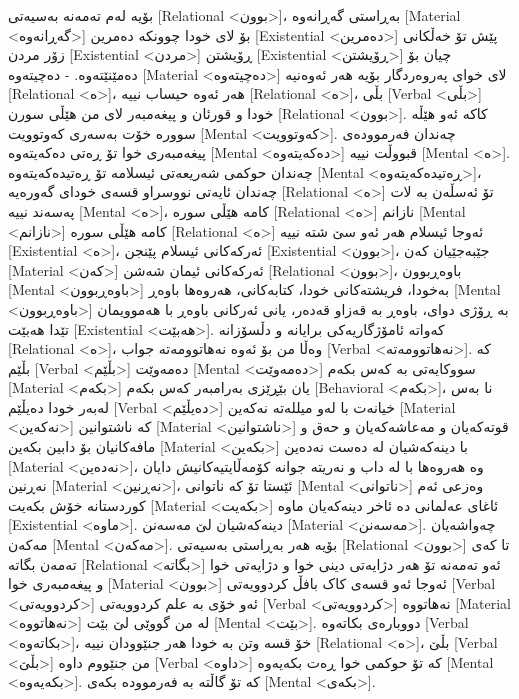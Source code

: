 بۆیە لەم تەمەنە بەسیەتی [Relational <بوون>]، بەڕاستی گەڕانەوە [Material <گەڕانەوە>] بۆ لای خودا چوونکە دەمرین [Existential <دەمرین>] پێش تۆ خەڵکانی زۆر مردن [Existential <مردن>] ڕۆیشتن [Existential <ڕۆیشتن>] چیان بۆ دەمێنێتەوە. - دەچیتەوە [Material <دەچیتەوە>] لای خوای پەروەردگار بۆیە هەر ئەوەنیە [Relational <ە>]، هەر ئەوە حیساب نییە [Relational <ە>]، بڵی [Verbal <بڵی>] خودا و قورئان و پیغەمبەر لای من هێڵی سورن [Relational <بوون>]. کاکە ئەو هێڵە سوورە خۆت بەسەری کەوتوویت [Mental <کەوتوویت>]. چەندان فەرموودەی پیغەمبەری خوا تۆ ڕەتی دەکەیتەوە [Mental <دەکەیتەوە>] قبووڵت نییە [Mental <ە>].
چەندان حوکمی شەریعەتی ئیسلامە تۆ ڕەتیدەکەیتەوە [Mental <ڕەتیدەکەیتەوە>]، چەندان ئایەتی نووسراو قسەی خودای گەورەیە [Relational <ە>] تۆ ئەسڵەن بە لات پەسەند نییە [Mental <ە>]، کامە هێڵی سورە [Relational <ە>] نازانم [Mental <نازانم>] کامە هێڵی سورە [Relational <ە>] ئەوجا ئیسلام هەر ئەو سێ شتە نییە [Existential <ە>]، ئەرکەکانی ئیسلام پێنجن [Existential <بوون>]، جێبەجێیان کەن [Material <کەن>] ئەرکەکانی ئیمان شەشن [Relational <بوون>]، باوەڕبوون [Mental <باوەڕبوون>] بەخودا، فریشتەکانی خودا، کتابەکانی، هەروەها باوەڕ [Mental <باوەڕبوون>] بە ڕۆژی دوای، باوەڕ بە قەزاو قەدەر، یانی ئەرکانی باوەڕ با هەموویمان تێدا هەبێت [Existential <هەبێت>]. کەواتە ئامۆژگاریەکی برایانە و دڵسۆزانە [Relational <ە>]، وەڵا من بۆ ئەوە نەهاتوومەتە جواب [Verbal <نەهاتوومەتە>].
کە بڵێم [Verbal <بڵێم>] دەمەوێت [Mental <دەمەوێت>] سووکایەتی بە کەس بکەم [Material <بکەم>] یان بێڕێزی بەرامبەر کەس بکەم [Behavioral <بکەم>]، نا بەس لەبەر خودا دەیڵێم [Verbal <دەیڵێم>] خیانەت با لەو میللەتە نەکەین [Material <نەکەین>] کە ناشتوانین [Material <ناشتوانین>] قوتەکەیان و مەعاشەکەیان و حەق و مافەکانیان بۆ دابین بکەین [Material <بکەین>] با دینەکەشیان لە دەست نەدەین [Material <نەدەین>]، وە هەروەها با لە داب و نەریتە جوانە کۆمەڵایتیەکانیش دایان نەڕنین [Material <نەڕنین>]، ئێستا تۆ کە ناتوانی [Mental <ناتوانی>] وەزعی ئەم کوردستانە خۆش بکەیت [Material <بکەیت>] ئاغای عەلمانی دە ئاخر دینەکەیان ماوە [Existential <ماوە>].
دینەکەشیان لێ مەسەنن [Material <مەسەنن>]. چەواشەیان مەکەن [Mental <مەکەن>]. بۆیە هەر بەڕاستی بەسیەتی [Relational <بوون>] تا کەی تەمەن بگاتە [Relational <بگاتە>] ئەو تەمەنە تۆ هەر دژایەتی دینی خوا و دژایەتی خوا و پیغەمبەری خوا [Material <بوون>] ئەوجا ئەو قسەی کاک بافڵ کردوویەتی [Verbal <کردوویەتی>] ئەو خۆی بە علم کردوویەتی [Verbal <کردوویەتی>] نەهاتووە [Material <نەهاتووە>] لە من گووێی لێ بێت [Mental <بێت>]. دووبارەی بکاتەوە [Verbal <بکاتەوە>]، خۆ قسە وتن بە خودا هەر جنێوودان نییە [Relational <ە>]، بڵێ [Verbal <بڵێ>] من جنێووم داوە [Verbal <داوە>] کە تۆ حوکمی خوا ڕەت بکەیەوە [Mental <بکەیەوە>]. کە تۆ گاڵتە بە فەرموودە بکەی [Mental <بکەی>].

